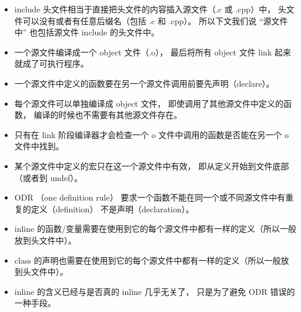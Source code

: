 
\begin{itemize}
\item include 头文件相当于直接把头文件的内容插入源文件（.c 或 .cpp）中， 头文件可以没有或者有任意后缀名（包括 .c 和 .cpp）。 所以下文我们说 “源文件中” 也包括源文件 include 的头文件中。
\item 一个源文件编译成一个 object 文件（.o）， 最后将所有 object 文件 link 起来就成了可执行程序。
\item 一个源文件中定义的函数要在另一个源文件调用前要先声明（declare）。
\item 每个源文件可以单独编译成 object 文件， 即使调用了其他源文件中定义的函数， 编译的时候也不需要有其他源文件存在。
\item 只有在 link 阶段编译器才会检查一个 o 文件中调用的函数是否能在另一个 o 文件中找到。
\item 某个源文件中定义的宏只在这一个源文件中有效， 即从定义开始到文件底部（或者到 undef）。
\item ODR （one definition rule） 要求一个函数不能在同一个或不同源文件中有重复的定义（definition） 不是声明（declaration）。
\item inline 的函数/变量需要在使用到它的每个源文件中都有一样的定义（所以一般放到头文件中）。
\item class 的声明也需要在使用到它的每个源文件中都有一样的定义（所以一般放到头文件中）。
\item inline 的含义已经与是否真的 inline 几乎无关了， 只是为了避免 ODR 错误的一种手段。
\end{itemize}
